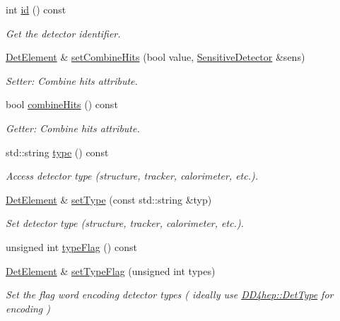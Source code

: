 \begin{DoxyCompactItemize}
int \hyperlink{class_d_d4hep_1_1_geometry_1_1_det_element_a7996df1e7f9605cb7e4ee8eae80adca3}{id} () const
\begin{DoxyCompactList}\small\item\em Get the detector identifier. \end{DoxyCompactList}\item 
\hyperlink{class_d_d4hep_1_1_geometry_1_1_det_element}{Det\+Element} \& \hyperlink{class_d_d4hep_1_1_geometry_1_1_det_element_a3b5dbbb87e8e1ddb64fc94e98cd5a70b}{set\+Combine\+Hits} (bool value, \hyperlink{class_d_d4hep_1_1_geometry_1_1_sensitive_detector}{Sensitive\+Detector} \&sens)
\begin{DoxyCompactList}\small\item\em Setter\+: Combine hits attribute. \end{DoxyCompactList}\item 
bool \hyperlink{class_d_d4hep_1_1_geometry_1_1_det_element_a2db4456fa1a78240e8545c64be3436f4}{combine\+Hits} () const
\begin{DoxyCompactList}\small\item\em Getter\+: Combine hits attribute. \end{DoxyCompactList}\item 
std\+::string \hyperlink{class_d_d4hep_1_1_geometry_1_1_det_element_a47782470bbe890c880a2824de6d1b547}{type} () const
\begin{DoxyCompactList}\small\item\em Access detector type (structure, tracker, calorimeter, etc.). \end{DoxyCompactList}\item 
\hyperlink{class_d_d4hep_1_1_geometry_1_1_det_element}{Det\+Element} \& \hyperlink{class_d_d4hep_1_1_geometry_1_1_det_element_a10b1fb8bbd6d21d75c421e658e59e0d8}{set\+Type} (const std\+::string \&typ)
\begin{DoxyCompactList}\small\item\em Set detector type (structure, tracker, calorimeter, etc.). \end{DoxyCompactList}\item 
unsigned int \hyperlink{class_d_d4hep_1_1_geometry_1_1_det_element_a06ea400c02eee5687ff5c996ad53198d}{type\+Flag} () const
\item 
\hyperlink{class_d_d4hep_1_1_geometry_1_1_det_element}{Det\+Element} \& \hyperlink{class_d_d4hep_1_1_geometry_1_1_det_element_a5a03e88dd7e1e3f215116f44dfca1dce}{set\+Type\+Flag} (unsigned int types)
\begin{DoxyCompactList}\small\item\em Set the flag word encoding detector types ( ideally use \hyperlink{class_d_d4hep_1_1_det_type}{D\+D4hep\+::\+Det\+Type} for encoding ) \end{DoxyCompactList}\item 

\end{DoxyCompactItemize}

